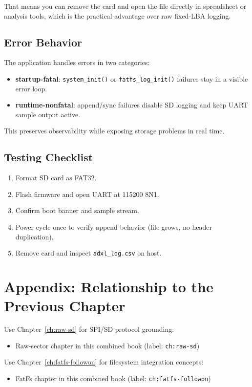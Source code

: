 That means you can remove the card and open the file directly in spreadsheet or analysis tools,
which is the practical advantage over raw fixed-LBA logging.

\section{Error Behavior}

The application handles errors in two categories:
\begin{itemize}[leftmargin=*]
\item \textbf{startup-fatal}: \texttt{system\_init()} or \texttt{fatfs\_log\_init()} failures stay in a visible error loop.
\item \textbf{runtime-nonfatal}: append/sync failures disable SD logging and keep UART sample output active.
\end{itemize}

This preserves observability while exposing storage problems in real time.

\section{Testing Checklist}

\begin{enumerate}[leftmargin=*]
\item Format SD card as FAT32.
\item Flash firmware and open UART at 115200 8N1.
\item Confirm boot banner and sample stream.
\item Power cycle once to verify append behavior (file grows, no header duplication).
\item Remove card and inspect \texttt{adxl\_log.csv} on host.
\end{enumerate}

\chapter*{Appendix: Relationship to the Previous Chapter}

Use Chapter~\ref{ch:raw-sd} for SPI/SD protocol grounding:
\begin{itemize}[leftmargin=*]
\item Raw-sector chapter in this combined book (label: \texttt{ch:raw-sd})
\end{itemize}

Use Chapter~\ref{ch:fatfs-followon} for filesystem integration concepts:
\begin{itemize}[leftmargin=*]
\item FatFs chapter in this combined book (label: \texttt{ch:fatfs-followon})
\end{itemize}
